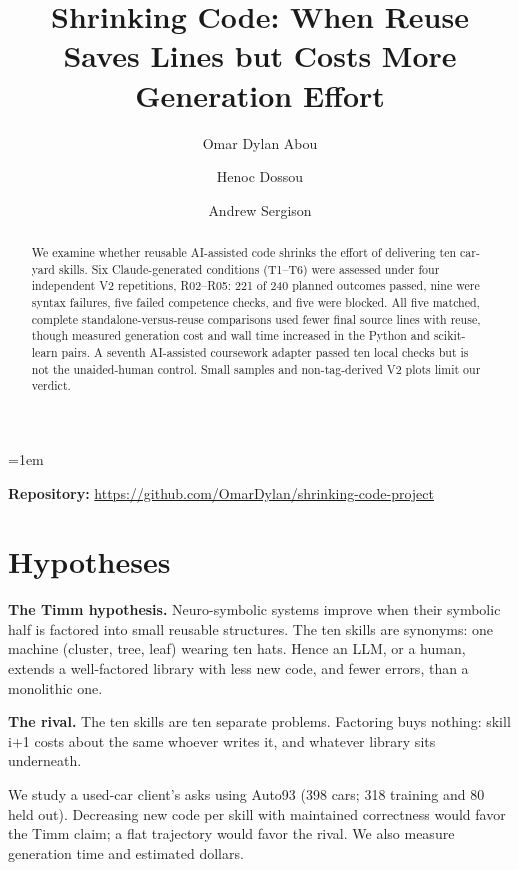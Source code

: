 \documentclass[sigconf,nonacm]{acmart}
\begin{document}
\emergencystretch=1em
\title{Shrinking Code: When Reuse Saves Lines but Costs More Generation Effort}
\author{Omar Dylan Abou}
\author{Henoc Dossou}
\author{Andrew Sergison}
\renewcommand{\shortauthors}{Abou, Dossou, and Sergison}
\begin{abstract}
We examine whether reusable AI-assisted code shrinks the effort of delivering ten car-yard skills. Six Claude-generated conditions (T1--T6) were assessed under four independent V2 repetitions, R02--R05: 221 of 240 planned outcomes passed, nine were syntax failures, five failed competence checks, and five were blocked. All five matched, complete standalone-versus-reuse comparisons used fewer final source lines with reuse, though measured generation cost and wall time increased in the Python and scikit-learn pairs. A seventh AI-assisted coursework adapter passed ten local checks but is not the unaided-human control. Small samples and non-tag-derived V2 plots limit our verdict.
\end{abstract}
\maketitle
\noindent\textbf{Repository:} \url{https://github.com/OmarDylan/shrinking-code-project}

\section{Hypotheses}
\textbf{The Timm hypothesis.} Neuro-symbolic systems improve when their symbolic half is factored into small reusable structures. The ten skills are synonyms: one machine (cluster, tree, leaf) wearing ten hats. Hence an LLM, or a human, extends a well-factored library with less new code, and fewer errors, than a monolithic one.

\textbf{The rival.} The ten skills are ten separate problems. Factoring buys nothing: skill i+1 costs about the same whoever writes it, and whatever library sits underneath.

We study a used-car client's asks using Auto93 (398 cars; 318 training and 80 held out). Decreasing new code per skill with maintained correctness would favor the Timm claim; a flat trajectory would favor the rival. We also measure generation time and estimated dollars.
\end{document}

